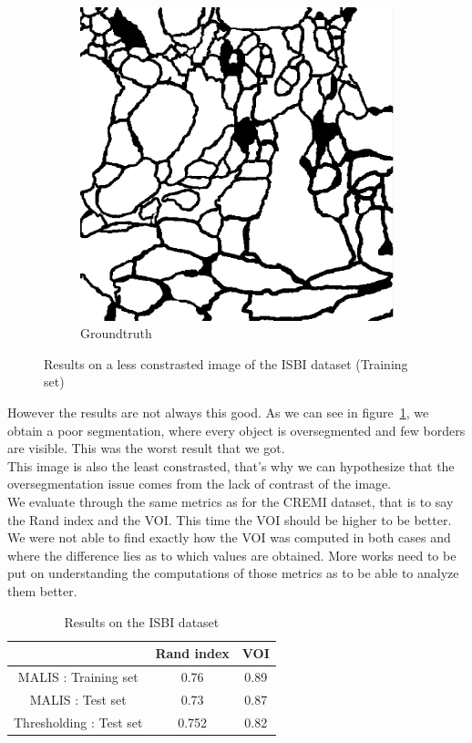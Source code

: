 \begin{figure}[!htbp]
\begin{subfigure}[t]{0.31\textwidth}
        \includegraphics[height=0.7\textwidth]{./images/isbi_gt_2.png}
        \caption{Groundtruth}
    \end{subfigure}
	\caption{Results on a less constrasted image of the ISBI dataset (Training
	set)}
    \label{fig:isbi_result_fail}
\end{figure}

However the results are not always this good. As we can see in
figure~\ref{fig:isbi_result_fail}, we obtain a poor segmentation, where every
object is oversegmented and few borders are visible. This was the worst result
that we got.\\
This image is also the least constrasted, that's why we can hypothesize that the
oversegmentation issue comes from the lack of contrast of the image.\\

We evaluate through the same metrics as for the CREMI dataset, that is to say the Rand index and the VOI.
This time the VOI should be higher to be better.\\
We were not able to find exactly how the VOI was computed in both cases and
where the difference lies as to which values are obtained. More works need to
be put on understanding the computations of those metrics as to be able to
analyze them better.

\begin{table}[!htbp]
	\centering
	\begin{tabular}{|c|c|c|}
		\hline
		& Rand index & VOI \\
		\hline
		MALIS : Training set & 0.76 & 0.89\\
		\hline
		MALIS : Test set & 0.73 & 0.87\\
		\hline
		Thresholding : Test set & 0.752 & 0.82\\
		\hline
	\end{tabular}
	\caption{Results on the ISBI dataset}
	\label{tab:isbi_res}
\end{table}

